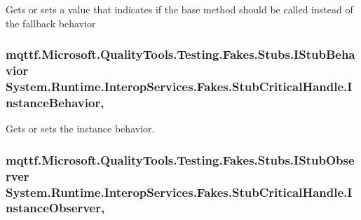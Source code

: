 Gets or sets a value that indicates if the base method should be called instead of the fallback behavior

\hypertarget{class_system_1_1_runtime_1_1_interop_services_1_1_fakes_1_1_stub_critical_handle_a325270aeb3ef22f82248a74887183fef}{
\subsubsection[{Instance\-Behavior}]{\setlength{\rightskip}{0pt plus 5cm}mqttf.\-Microsoft.\-Quality\-Tools.\-Testing.\-Fakes.\-Stubs.\-I\-Stub\-Behavior System.\-Runtime.\-Interop\-Services.\-Fakes.\-Stub\-Critical\-Handle.\-Instance\-Behavior\hspace{0.3cm}{\ttfamily [get]}, {\ttfamily [set]}}}\label{class_system_1_1_runtime_1_1_interop_services_1_1_fakes_1_1_stub_critical_handle_a325270aeb3ef22f82248a74887183fef}


Gets or sets the instance behavior.

\hypertarget{class_system_1_1_runtime_1_1_interop_services_1_1_fakes_1_1_stub_critical_handle_a639ad15f9567ddcacb46c233feff41a6}{
\subsubsection[{Instance\-Observer}]{\setlength{\rightskip}{0pt plus 5cm}mqttf.\-Microsoft.\-Quality\-Tools.\-Testing.\-Fakes.\-Stubs.\-I\-Stub\-Observer System.\-Runtime.\-Interop\-Services.\-Fakes.\-Stub\-Critical\-Handle.\-Instance\-Observer\hspace{0.3cm}{\ttfamily [get]}, {\ttfamily [set]}}}\label{class_system_1_1_runtime_1_1_interop_services_1_1_fakes_1_1_stub_critical_handle_a639ad15f9567ddcacb46c233feff41a6}


